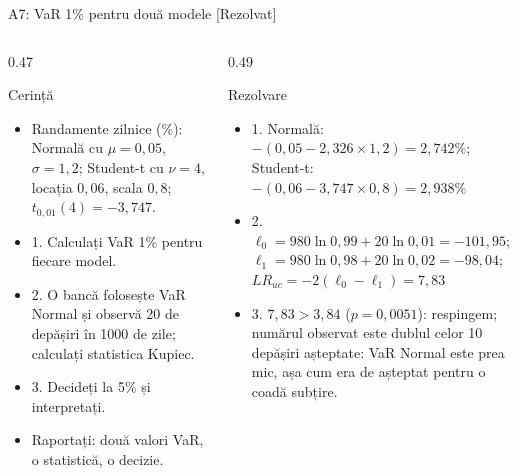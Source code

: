 \begin{frame}{A7: VaR 1\% pentru două modele [Rezolvat]}
\itemsize{\scriptsize}
\begin{columns}[T]
\begin{column}{0.47\textwidth}
\begin{block}{Cerință}
\begin{itemize}
    \item Randamente zilnice (\%): Normală cu $\mu = 0{,}05$, $\sigma = 1{,}2$; Student-t cu $\nu = 4$, locația $0{,}06$, scala $0{,}8$; $t_{0{,}01}(4) = -3{,}747$.
    \item 1. Calculați VaR 1\% pentru fiecare model.
    \item 2. O bancă folosește VaR Normal și observă 20 de depășiri în 1000 de zile; calculați statistica Kupiec.
    \item 3. Decideți la 5\% și interpretați.
    \item Raportați: două valori VaR, o statistică, o decizie.
\end{itemize}
\end{block}
\end{column}
\begin{column}{0.49\textwidth}
\begin{exampleblock}{Rezolvare}
\begin{itemize}
    \item 1. Normală: $-(0{,}05 - 2{,}326 \times 1{,}2) = 2{,}742\%$; Student-t: $-(0{,}06 - 3{,}747 \times 0{,}8) = 2{,}938\%$
    \item 2. $\ell_0 = 980\ln 0{,}99 + 20\ln 0{,}01 = -101{,}95$; $\ell_1 = 980\ln 0{,}98 + 20\ln 0{,}02 = -98{,}04$; $LR_{uc} = -2(\ell_0 - \ell_1) = 7{,}83$
    \item 3. $7{,}83 > 3{,}84$ ($p = 0{,}0051$): respingem; numărul observat este dublul celor 10 depășiri așteptate: VaR Normal este prea mic, așa cum era de așteptat pentru o coadă subțire.
\end{itemize}
\end{exampleblock}
\end{column}
\end{columns}
\end{frame}

